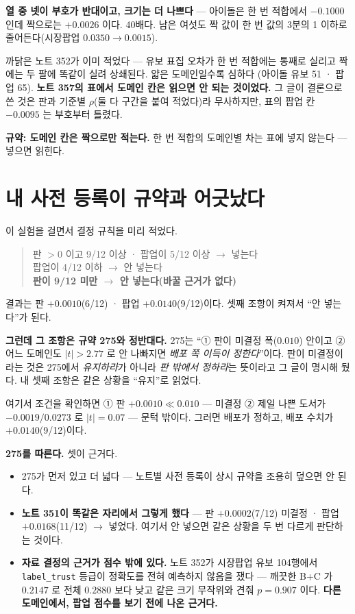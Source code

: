 \documentclass[11pt]{article}
\begin{document}
\textbf{열 중 넷이 부호가 반대이고, 크기는 더 나쁘다} --- 아이돌은 한 번
적합에서 $-0.1000$ 인데 짝으로는 $+0.0026$ 이다. 40배다. 남은 여섯도
짝 값이 한 번 값의 3분의 1 이하로 줄어든다(시장팝업 $0.0350 \to 0.0015$).

까닭은 노트 352가 이미 적었다 --- 유보 표집 오차가 한 번 적합에는 통째로
실리고 짝에는 두 팔에 똑같이 실려 상쇄된다. 얇은 도메인일수록 심하다
(아이돌 유보 51 · 팝업 65). \textbf{노트 357의 표에서 도메인 칸은 읽으면
안 되는 것이었다.} 그 글이 결론으로 쓴 것은 판과 기준별 $\rho$(둘 다
구간을 붙여 적었다)라 무사하지만, 표의 팝업 칸 $-0.0095$ 는 부호부터
틀렸다.

\textbf{규약: 도메인 칸은 짝으로만 적는다.} 한 번 적합의 도메인별 차는
표에 넣지 않는다 --- 넣으면 읽힌다.

\section{내 사전 등록이 규약과 어긋났다}

이 실험을 걸면서 결정 규칙을 미리 적었다.

\begin{quote}
판 $>0$ 이고 9/12 이상 · 팝업이 5/12 이상 $\to$ 넣는다 \\
팝업이 4/12 이하 $\to$ 안 넣는다 \\
\textbf{판이 9/12 미만 $\to$ 안 넣는다(바꿀 근거가 없다)}
\end{quote}

결과는 판 $+0.0010$(6/12) · 팝업 $+0.0140$(9/12)이다. 셋째 조항이 켜져서
``안 넣는다''가 된다.

\textbf{그런데 그 조항은 규약 275와 정반대다.} 275는 ``① 판이 미결정
폭($0.010$) 안이고 ② 어느 도메인도 $|t|>2.77$ 로 안 나빠지면 \emph{배포
쪽 이득이 정한다}''이다. 판이 미결정이라는 것은 275에서 \emph{유지하라}가
아니라 \emph{판 밖에서 정하라}는 뜻이라고 그 글이 명시해 뒀다. 내
셋째 조항은 같은 상황을 ``유지''로 읽었다.

여기서 조건을 확인하면 ① 판 $+0.0010 \ll 0.010$ --- 미결정 ② 제일 나쁜
도서가 $-0.0019/0.0273$ 로 $|t| = 0.07$ --- 문턱 밖이다. 그러면 배포가
정하고, 배포 수치가 $+0.0140$(9/12)이다.

\textbf{275를 따른다.} 셋이 근거다.
\begin{itemize}
\item 275가 먼저 있고 더 넓다 --- 노트별 사전 등록이 상시 규약을 조용히
덮으면 안 된다.
\item \textbf{노트 351이 똑같은 자리에서 그렇게 했다} --- 판
$+0.0002$(7/12) 미결정 · 팝업 $+0.0168$(11/12) $\to$ 넣었다. 여기서 안
넣으면 같은 상황을 두 번 다르게 판단하는 것이다.
\item \textbf{자료 결정의 근거가 점수 밖에 있다.} 노트 352가 시장팝업
유보 104행에서 \texttt{label\_trust} 등급이 정확도를 전혀 예측하지 않음을
쟀다 --- 깨끗한 B+C 가 $0.2147$ 로 전체 $0.2880$ 보다 낮고 같은 크기
무작위와 견줘 $p=0.907$ 이다. \textbf{다른 도메인에서, 팝업 점수를 보기
전에 나온 근거다.}
\end{itemize}
\end{document}
